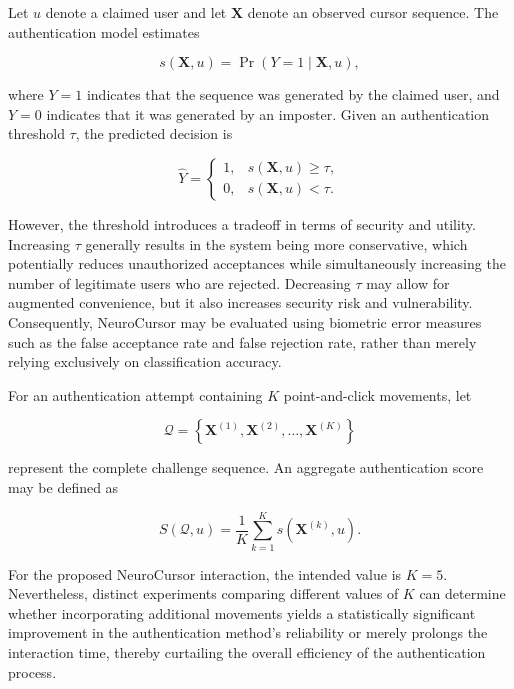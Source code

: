 \documentclass[conference]{IEEEtran}
\begin{document}
Let $u$ denote a claimed user and let $\mathbf{X}$ denote an observed cursor sequence. The authentication model estimates 

\begin{equation}
s(\mathbf{X},u)
=
\Pr(Y=1 \mid \mathbf{X},u), 
\label{eq:auth_probability}
\end{equation}

where $Y=1$ indicates that the sequence was generated by the claimed user, and $Y=0$ indicates that it was generated by an imposter. Given an authentication threshold $\tau$, the predicted decision is 

\begin{equation}
\widehat{Y}
=
\begin{cases}
1, & s(\mathbf{X}, u) \geq \tau,\\
0, & s(\mathbf{X}, u) < \tau.
\end{cases}
\label{eq:threshold_decision}
\end{equation}

However, the threshold introduces a tradeoff in terms of security and utility. Increasing $\tau$ generally results in the system being more conservative, which potentially reduces unauthorized acceptances while simultaneously increasing the number of legitimate users who are rejected. Decreasing $\tau$ may allow for augmented convenience, but it also increases security risk and vulnerability. Consequently, NeuroCursor may be evaluated using biometric error measures such as the false acceptance rate and false rejection rate, rather than merely relying exclusively on classification accuracy. 

For an authentication attempt containing $K$ point-and-click movements, let

\begin{equation}
\mathcal{Q}
=
\left\{
\mathbf{X}^{(1)},
\mathbf{X}^{(2)},
\ldots,
\mathbf{X}^{(K)}
\right\}
\label{eq:challenge_set}
\end{equation}

represent the complete challenge sequence. An aggregate authentication score may be defined as 

\begin{equation}
S(\mathcal{Q},u)
=
\frac{1}{K}
\sum_{k=1}^K
s\left(\mathbf{X}^{(k)},u\right).
\label{eq:aggregate_score}
\end{equation}

For the proposed NeuroCursor interaction, the intended value is $K=5$. Nevertheless, distinct experiments comparing different values of $K$ can determine whether incorporating additional movements yields a statistically significant improvement in the authentication method's reliability or merely prolongs the interaction time, thereby curtailing the overall efficiency of the authentication process. 
\end{document}
